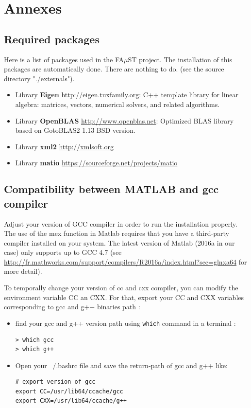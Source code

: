 \chapter{Annexes}\label{sec:Annexes}

\section{Required packages}\label{sec:ANNEXERequiredPackages}
Here is a list of packages used in the FA$\mu$ST project. The installation of this packages are automatically done. There are nothing to do. (see the source directory "./externals").
\begin{itemize}
\item Library \textbf{Eigen} \url{http://eigen.tuxfamily.org}: C++ template library for linear algebra: matrices, vectors, numerical solvers, and related algorithms.
\item Library \textbf{OpenBLAS} \url{http://www.openblas.net}:  Optimized BLAS library based on GotoBLAS2 1.13 BSD version.
\item Library \textbf{xml2} \url{http://xmlsoft.org}
\item Library \textbf{matio} \url{https://sourceforge.net/projects/matio}
\end{itemize}

\section{Compatibility between MATLAB and gcc compiler}\label{sec:ANNEXECompatibilityMatlabCompiler}
Adjust your version of GCC compiler in order to run the installation properly. The use of the mex function in Matlab requires that you have a third-party compiler installed on your system. The latest version of Matlab (2016a in our case) only supports up to GCC 4.7 (see \url{http://fr.mathworks.com/support/compilers/R2016a/index.html?sec=glnxa64} for more detail).

To temporally change your version of cc and cxx compiler, you can modify the environment variable CC an CXX. For that, export your CC and CXX variables corresponding to gcc and g++ binaries path :
\begin{itemize}
\item find your gcc and g++ version path using \texttt{which} command in a terminal :
\lstset{style=customBash}
\begin{lstlisting}
> which gcc
> which g++
\end{lstlisting}

\item Open your ~/.bashrc file and save the return-path of gcc and g++ like:
\lstset{style=customBash}
\begin{lstlisting}
# export version of gcc
export CC=/usr/lib64/ccache/gcc
export CXX=/usr/lib64/ccache/g++
\end{lstlisting}
\end{itemize}



